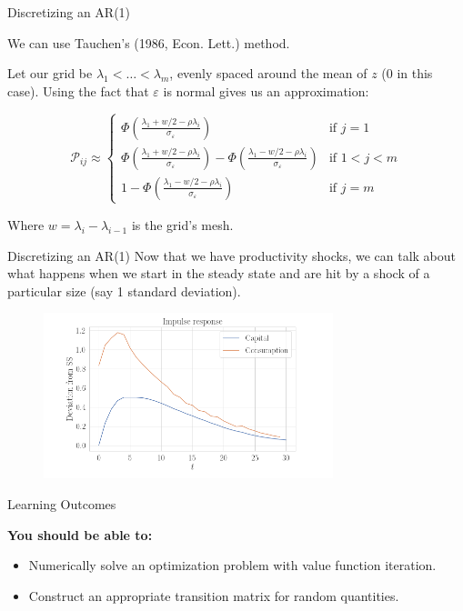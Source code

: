 \documentclass[11pt, xcolor={dvipsnames}, hyperref={colorlinks, allcolors=Blue}]{beamer}
\newcommand\bc[1]{{\usebeamercolor[fg]{frametitle} {\textbf{#1}}}} %
\renewcommand{\epsilon}{\varepsilon}
\begin{document}
\begin{frame}{Discretizing an AR(1)}

We can use Tauchen's (1986, Econ. Lett.) method. \bigskip

Let our grid be $\lambda_{1} < \dots < \lambda_{m}$, evenly spaced around the mean of $z$ (0 in this case). Using the fact that $\epsilon$ is normal gives us an approximation:

\[
\mathcal{P}_{ij} \approx
\begin{cases}
\Phi( \frac{\lambda_{1} + w/2 - \rho \lambda_{i}}{\sigma_{\epsilon}} ) & \text{if } j = 1\\
\Phi( \frac{\lambda_{1} + w/2 - \rho \lambda_{i}}{\sigma_{\epsilon}} ) - \Phi( \frac{\lambda_{1} - w/2 - \rho \lambda_{i}}{\sigma_{\epsilon}} )& \text{if } 1 < j < m\\
1 - \Phi( \frac{\lambda_{1} - w/2 - \rho \lambda_{i}}{\sigma_{\epsilon}} ) & \text{if } j=m
\end{cases}
\]
\medskip

Where $w = \lambda_{i} - \lambda_{i-1}$ is the grid's mesh. 
\end{frame}

\begin{frame}{Discretizing an AR(1)}
Now that we have productivity shocks, we can talk about what happens when we start in the steady state and are hit by a shock of a particular size (say 1 standard deviation). \bigskip

\begin{figure}
	\includegraphics[width=0.75\textwidth]{Chart5.png}
\end{figure}
\end{frame}

\begin{frame}{Learning Outcomes}

\bc{You should be able to:}

\begin{itemize}
	\item Numerically solve an optimization problem with value function iteration.
	\item Construct an appropriate transition matrix for random quantities.
\end{itemize}
\end{frame}
\end{document}
